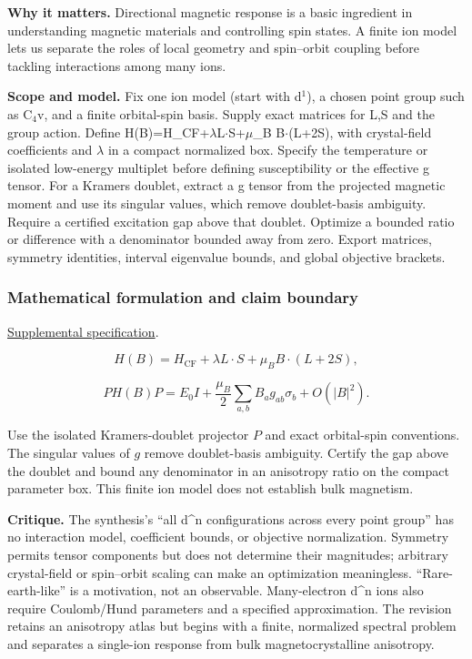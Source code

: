 \documentclass[
  11pt,
]{article}
\begin{document}
\textbf{Why it matters.} Directional magnetic response is a basic
ingredient in understanding magnetic materials and controlling spin
states. A finite ion model lets us separate the roles of local geometry
and spin--orbit coupling before tackling interactions among many ions.

\textbf{Scope and model.} Fix one ion model (start with
d\ensuremath{{}^{1}}), a chosen point group such as
C\ensuremath{{}_{4}}v, and a finite orbital-spin basis. Supply exact
matrices for L,S and the group action. Define
H(B)=H\_CF+\ensuremath{\lambda}L\ensuremath{\cdot}S+\ensuremath{\mu}\_B
B\ensuremath{\cdot}(L+2S), with crystal-field coefficients and
\ensuremath{\lambda} in a compact normalized box. Specify the
temperature or isolated low-energy multiplet before defining
susceptibility or the effective g tensor. For a Kramers doublet, extract
a g tensor from the projected magnetic moment and use its singular
values, which remove doublet-basis ambiguity. Require a certified
excitation gap above that doublet. Optimize a bounded ratio or
difference with a denominator bounded away from zero. Export matrices,
symmetry identities, interval eigenvalue bounds, and global objective
brackets.

\subsubsection{Mathematical formulation and claim boundary}

\href{https://github.com/rick-stevens-ai/Pure-Thought/blob/main/supplemental/S01.md}{Supplemental
specification}.

\[H(B)=H_{\mathrm{CF}}+\lambda L\cdot S+\mu_B B\cdot(L+2S),\]

\[P H(B)P=E_0I+\frac{\mu_B}{2}\sum_{a,b}B_a g_{ab}\sigma_b+O(|B|^2).\]

Use the isolated Kramers-doublet projector \(P\) and exact orbital-spin
conventions. The singular values of \(g\) remove doublet-basis
ambiguity. Certify the gap above the doublet and bound any denominator
in an anisotropy ratio on the compact parameter box. This finite ion
model does not establish bulk magnetism.

\textbf{Critique.} The synthesis's ``all d\^{}n configurations across
every point group'' has no interaction model, coefficient bounds, or
objective normalization. Symmetry permits tensor components but does not
determine their magnitudes; arbitrary crystal-field or spin--orbit
scaling can make an optimization meaningless. ``Rare-earth-like'' is a
motivation, not an observable. Many-electron d\^{}n ions also require
Coulomb/Hund parameters and a specified approximation. The revision
retains an anisotropy atlas but begins with a finite, normalized
spectral problem and separates a single-ion response from bulk
magnetocrystalline anisotropy.
\end{document}
